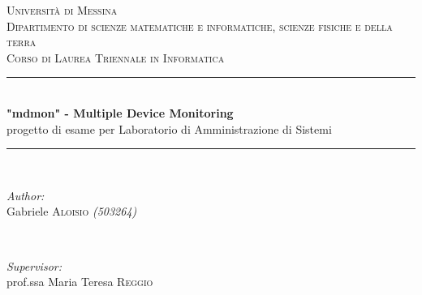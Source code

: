 \documentclass[11pt]{article}
\begin{document}
\begin{titlepage}

    \newcommand{\HRule}{\rule{\linewidth}{0.5mm}} %

    \center %


    \textsc{\LARGE Università di Messina}\\[1.5cm] %
    \textsc{\Large Dipartimento di scienze matematiche e informatiche, scienze fisiche e della terra}\\[0.5cm] %
    \textsc{\large Corso di Laurea Triennale in Informatica}\\[0.5cm] %


    \HRule \\[0.4cm]
    { \huge \bfseries "mdmon" - Multiple Device Monitoring}\\[0.4cm] %
    progetto di esame per Laboratorio di Amministrazione di Sistemi
    \HRule \\[1.5cm]


    \begin{minipage}{0.4\textwidth}
        \begin{flushleft} \large
            \emph{Author:}\\
            Gabriele \textsc{Aloisio} \textit{(503264)} \\
        \end{flushleft}
    \end{minipage}
    ~
    \begin{minipage}{0.4\textwidth}
        \begin{flushright} \large
            \emph{Supervisor:} \\
            prof.ssa Maria Teresa \textsc{Reggio} \\
        \end{flushright}
    \end{minipage}\\[2cm]


\end{titlepage}
\end{document}
